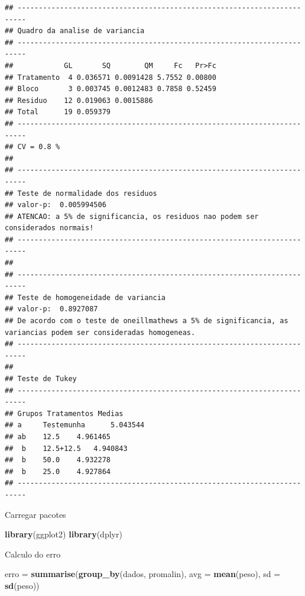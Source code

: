 \documentclass[
]{book}
\newenvironment{Shaded}{\begin{snugshade}}{\end{snugshade}}
\newcommand{\DataTypeTok}[1]{\textcolor[rgb]{0.13,0.29,0.53}{#1}}
\newcommand{\KeywordTok}[1]{\textcolor[rgb]{0.13,0.29,0.53}{\textbf{#1}}}
\newcommand{\NormalTok}[1]{#1}
\newcommand{\StringTok}[1]{\textcolor[rgb]{0.31,0.60,0.02}{#1}}
\begin{document}
\begin{verbatim}
## ------------------------------------------------------------------------
## Quadro da analise de variancia
## ------------------------------------------------------------------------
##            GL       SQ        QM     Fc   Pr>Fc
## Tratamento  4 0.036571 0.0091428 5.7552 0.00800
## Bloco       3 0.003745 0.0012483 0.7858 0.52459
## Residuo    12 0.019063 0.0015886               
## Total      19 0.059379                         
## ------------------------------------------------------------------------
## CV = 0.8 %
## 
## ------------------------------------------------------------------------
## Teste de normalidade dos residuos 
## valor-p:  0.005994506 
## ATENCAO: a 5% de significancia, os residuos nao podem ser considerados normais!
## ------------------------------------------------------------------------
## 
## ------------------------------------------------------------------------
## Teste de homogeneidade de variancia 
## valor-p:  0.8927087 
## De acordo com o teste de oneillmathews a 5% de significancia, as variancias podem ser consideradas homogeneas.
## ------------------------------------------------------------------------
## 
## Teste de Tukey
## ------------------------------------------------------------------------
## Grupos Tratamentos Medias
## a     Testemunha      5.043544 
## ab    12.5    4.961465 
##  b    12.5+12.5   4.940843 
##  b    50.0    4.932278 
##  b    25.0    4.927864 
## ------------------------------------------------------------------------
\end{verbatim}

Carregar pacotes

\begin{Shaded}
\begin{Highlighting}[]
\KeywordTok{library}\NormalTok{(ggplot2)}
\KeywordTok{library}\NormalTok{(dplyr)}
\end{Highlighting}
\end{Shaded}

Calculo do erro

\begin{Shaded}
\begin{Highlighting}[]
\NormalTok{erro =}\StringTok{ }\KeywordTok{summarise}\NormalTok{(}\KeywordTok{group_by}\NormalTok{(dados, promalin), }
       \DataTypeTok{avg =} \KeywordTok{mean}\NormalTok{(peso), }\DataTypeTok{sd =} \KeywordTok{sd}\NormalTok{(peso))}
\end{Highlighting}
\end{Shaded}
\end{document}
